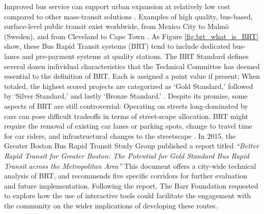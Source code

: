 {{        {
            Improved bus service can support urban expansion at relatively low cost compared to other mass-transit solutions \cite{williams2015better}. Examples of high quality, bus-based, surface-level public transit exist worldwide, from Mexico City to Malmö (Sweden), and from Cleveland to Cape Town \cite{wirasinghe2013bus}. As Figure \eqref{fig:brt_what_is_BRT} show, these Bus Rapid Transit systems (BRT) tend to include dedicated bus-lanes and pre-payment systems at quality stations. The BRT Standard defines several dozen individual characteristics that the Technical Committee has deemed essential to the definition of BRT. Each is assigned a point value if present; When totaled, the highest scored projects are categorized as `Gold Standard,' followed by `Silver Standard,' and lastly `Bronze Standard.' \cite{Aboutthe77:online}.
            Despite its promise, some aspects of BRT are still controversial: Operating on streets long-dominated by cars can pose difficult tradeoffs in terms of street-scape allocation. BRT might require the removal of existing car lanes or parking spots, change to travel time for car riders, and infrastructural changes to the streetscape \cite{wirasinghe2013bus}.
            \newline
            In 2015, the Greater Boston Bus Rapid Transit Study Group published a report titled \textit{``Better Rapid Transit for Greater Boston: The Potential for Gold Standard Bus Rapid Transit across the Metropolitan Area''} \cite{williams2015better} This document offers a city-wide technical analysis of BRT, and recommends five specific corridors for further evaluation and future implementation. Following the report, The Barr Foundation requested to explore how the use of interactive tools could facilitate the engagement with the community on the wider implications of developing these routes.
        }

}}

